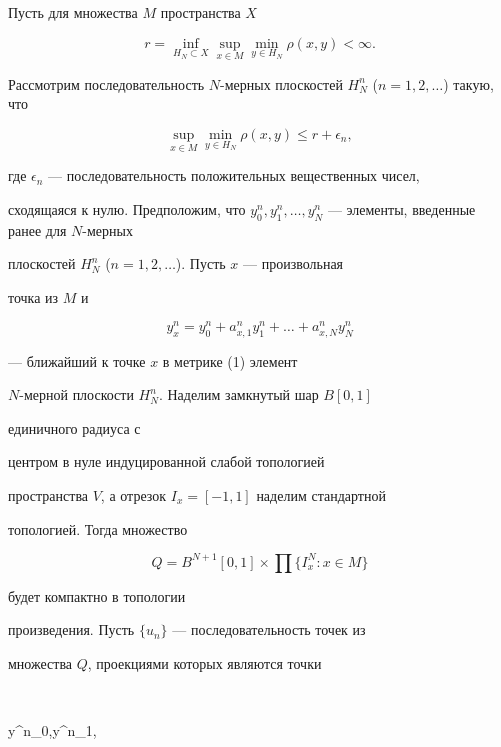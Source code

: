 Пусть для множества $M$ пространства $X$ 


$$


r = \inf\limits_{H_{N} \subset X}{\sup\limits_{x \in M}{\min\limits_{y \in


H_{N}}{\rho(x,y)}}} < \infty.


$$


Рассмотрим последовательность $N$-мерных плоскостей $H^{n}_{N}$ ($n =


1, 2, \dotsc$) такую, что


$$


\sup\limits_{x \in M}{\min\limits_{y \in


H_{N}}{\rho(x,y)}} \leq r + \epsilon_{n},


$$


где $\epsilon_{n}$ --- последовательность положительных вещественных чисел,


сходящаяся к нулю. Предположим, что $y^{n}_{0},y^{n}_{1},


\dotsc,y^{n}_{N}$ --- элементы, введенные ранее для $N$-мерных


плоскостей $H^{n}_{N}$ ($n = 1, 2, \dotsc$). Пусть $x$ --- произвольная


точка из $M$ и 


$$


y^{n}_{x} = y^{n}_{0} + a^{n}_{x,1}y^{n}_{1} + \dotsc


+a^{n}_{x,N}y^{n}_{N}


$$


--- ближайший к точке $x$ в метрике (1) элемент


$N$-мерной плоскости $H^{n}_{N}$. Наделим замкнутый шар $B[0,1]$


единичного радиуса с


центром в нуле индуцированной слабой топологией


пространства $V$, а отрезок $I_{x} = [-1,1]$ наделим стандартной


топологией. Тогда множество


$$


Q = B^{N + 1}[0,1] \times\prod \{I^{N}_{x} : x \in M \}


$$


будет компактно в топологии


произведения. Пусть $\{u_{n}\}$ --- последовательность точек из


множества $Q$, проекциями которых являются точки


$$


y^{n}_{0},y^{n}_{1},



